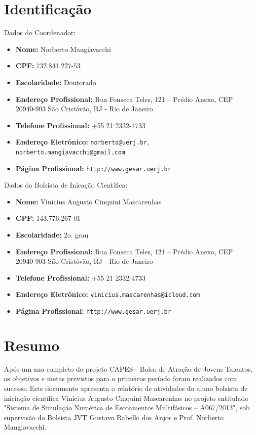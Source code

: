 \documentclass[a4paper,portuges,12pt]{article}
\begin{document}
	


\section{Identificação}

\noindent Dados do Coordenador: 
\begin{itemize}
	\item \textbf{Nome:} Norberto Mangiavacchi
	\item \textbf{CPF:} 732.841.227-53
	\item \textbf{Escolaridade:} Doutorado
	\item \textbf{Endereço Profissional:} Rua Fonseca Teles, 121 --
	Prédio Anexo, CEP 20940-903 São Cristóvão, RJ - Rio de Janeiro
	\item \textbf{Telefone Profissional:} +55 21 2332-4733
	\item \textbf{Endereço Eletrônico:} {\tt norberto@uerj.br}, 
	                                    {\tt norberto.mangiavacchi@gmail.com}
	\item \textbf{Página Profissional:} {\tt http://www.gesar.uerj.br}
\end{itemize}

\hspace{1cm}

\noindent Dados do Bolsista de Inicação Científica: 
\begin{itemize}
	\item \textbf{Nome:} Vinícius Augusto Cinquini Mascarenhas
	\item \textbf{CPF:} 143.776.267-01
	\item \textbf{Escolaridade:} 2o. grau
	\item \textbf{Endereço Profissional:} Rua Fonseca Teles, 121 --
	Prédio Anexo, CEP 20940-903 São Cristóvão, RJ - Rio de Janeiro
	\item \textbf{Telefone Profissional:} +55 21 2332-4733
	\item \textbf{Endereço Eletrônico:} {\tt vinicius.mascarenhas@icloud.com}
	\item \textbf{Página Profissional:} {\tt http://www.gesar.uerj.br}
\end{itemize}

\clearpage

\section{Resumo}
Após um ano completo do projeto CAPES - Bolsa de Atração de Jovens
Talentos, os objetivos e metas previstos para o primeiros período foram
realizados com sucesso. Este documento apresenta o relatório de
atividades do aluno bolsista de iniciação científica Vinícius Augusto
Cinquini Mascarenhas no projeto entitulado "Sistema de Simulação
Numérica de Escoamentos Multifásicos -- A067/2013", sob supervisão do
Bolsista JVT Gustavo Rabello dos Anjos e Prof. Norberto Mangiavacchi. 
\clearpage
\end{document}
